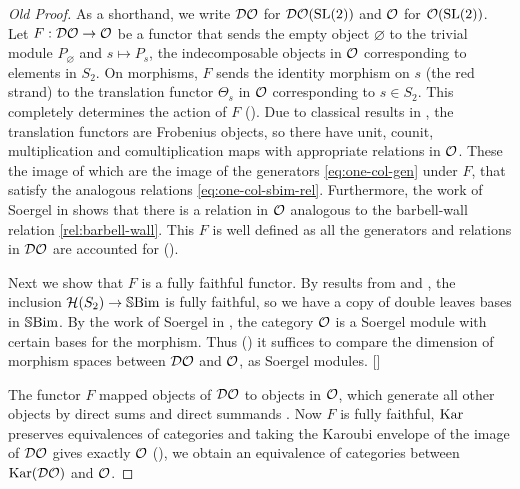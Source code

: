\begin{proof}[Old Proof]
    As a shorthand, we write $\mathcal{DO}$ for $\mathcal{DO}(\operatorname{SL}(2))$ and $\mathcal{O}$ for $\mathcal{O}(\operatorname{SL}(2))$. Let $F: \mathcal{DO} \to \mathcal{O}$ be a functor that sends the empty object $\varnothing$ to the trivial module $P_\varnothing$ and $s \mapsto P_s$, the indecomposable objects in $\mathcal{O}$ corresponding to elements in $S_2$. On morphisms, $F$ sends the identity morphism on $s$ (the red strand) to the translation functor $\Theta_s$ in $\mathcal{O}$ corresponding to $s \in S_2$. This completely determines the action of $F$ (). Due to classical results in \cite{humphreys-category-O}, the translation functors are Frobenius objects, so there have unit, counit, multiplication and comultiplication maps with appropriate relations in $\mathcal{O}$. These the image of which are the image of the generators \eqref{eq:one-col-gen} under $F$, that satisfy the analogous relations \eqref{eq:one-col-sbim-rel}. Furthermore, the work of Soergel in \cite{soergel-category-O} shows that there is a relation in $\mathcal{O}$ analogous to the barbell-wall relation \eqref{rel:barbell-wall}. This $F$ is well defined as all the generators and relations in $\mathcal{DO}$ are accounted for ().

    Next we show that $F$ is a fully faithful functor. By results from \cite{elias-williamson-soergel-calculus} and \cite{libedinsky-lightleavesbasis}, the inclusion $\mathcal{H}(S_2) \to \operatorname{\mathbb{S}Bim}$ is fully faithful, so we have a copy of double leaves bases in $\operatorname{\mathbb{S}Bim}$. By the work of Soergel in \cite{soergel-category-O}, the category $\mathcal{O}$ is a Soergel module  with certain bases for the morphism. Thus () it suffices to  compare the dimension of morphism spaces between $\mathcal{DO}$ and $\mathcal{O}$, as Soergel modules. []

    The functor $F$ mapped objects of $\mathcal{DO}$ to objects  in $\mathcal{O}$, which generate all other objects by direct sums and direct summands . Now $F$ is fully faithful, $\operatorname{Kar}$ preserves equivalences of categories and taking the Karoubi envelope of the image of $\mathcal{DO}$ gives exactly $\mathcal{O}$ (), we obtain an equivalence of categories between $\operatorname{Kar}(\mathcal{DO})$ and $\mathcal{O}$.
\end{proof}
